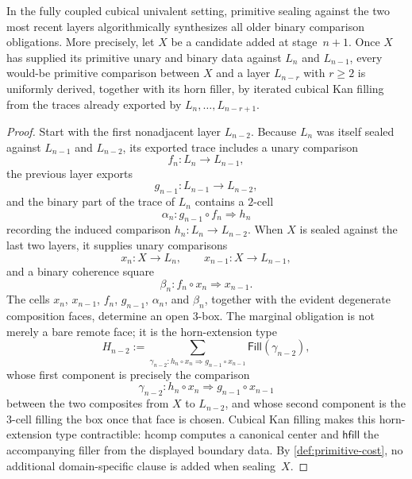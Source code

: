 \documentclass{lmcs}
\newcommand{\hcomp}{\mathrm{hcomp}}
\begin{document}
\begin{lem}
\label{lem:telescopic}
In the fully coupled cubical univalent setting, primitive sealing against the two most recent layers algorithmically synthesizes all older binary comparison obligations. More precisely, let $X$ be a candidate added at stage~$n+1$. Once $X$ has supplied its primitive unary and binary data against $L_n$ and $L_{n-1}$, every would-be primitive comparison between $X$ and a layer $L_{n-r}$ with $r \geq 2$ is uniformly derived, together with its horn filler, by iterated cubical Kan filling from the traces already exported by $L_n,\dots,L_{n-r+1}$.
\end{lem}

\begin{proof}
Start with the first nonadjacent layer $L_{n-2}$. Because $L_n$ was itself sealed against $L_{n-1}$ and $L_{n-2}$, its exported trace includes a unary comparison
\[
  f_n : L_n \to L_{n-1},
\]
the previous layer exports
\[
  g_{n-1} : L_{n-1} \to L_{n-2},
\]
and the binary part of the trace of $L_n$ contains a $2$-cell
\[
  \alpha_n : g_{n-1}\circ f_n \Rightarrow h_n
\]
recording the induced comparison $h_n : L_n \to L_{n-2}$. When $X$ is sealed against the last two layers, it supplies unary comparisons
\[
  x_n : X \to L_n,
  \qquad
  x_{n-1} : X \to L_{n-1},
\]
and a binary coherence square
\[
  \beta_n : f_n \circ x_n \Rightarrow x_{n-1}.
\]
The cells $x_n$, $x_{n-1}$, $f_n$, $g_{n-1}$, $\alpha_n$, and $\beta_n$, together with the evident degenerate composition faces, determine an open $3$-box. The marginal obligation is not merely a bare remote face; it is the horn-extension type
\[
  H_{n-2}
  :=
  \sum_{\gamma_{n-2} : h_n \circ x_n \Rightarrow g_{n-1}\circ x_{n-1}}
  \mathsf{Fill}(\gamma_{n-2}),
\]
whose first component is precisely the comparison
\[
  \gamma_{n-2} : h_n \circ x_n \Rightarrow g_{n-1}\circ x_{n-1}
\]
between the two composites from $X$ to $L_{n-2}$, and whose second component is the $3$-cell filling the box once that face is chosen. Cubical Kan filling makes this horn-extension type contractible: $\hcomp$ computes a canonical center and $\mathsf{hfill}$ the accompanying filler from the displayed boundary data. By \autoref{def:primitive-cost}, no additional domain-specific clause is added when sealing~$X$.


\end{proof}
\end{document}
